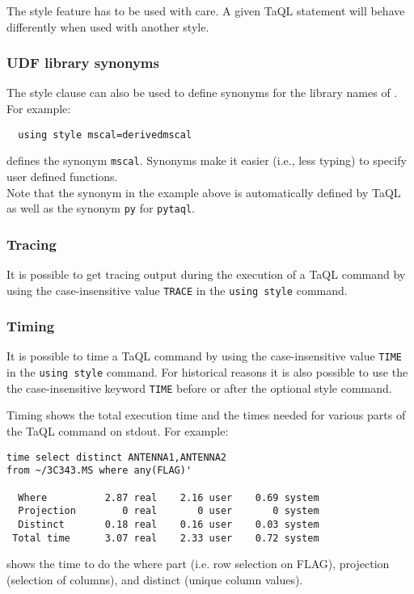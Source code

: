 The style feature has to be used with care. A given TaQL statement will
behave differently when used with another style.

\subsubsection{UDF library synonyms}
The style clause can also be used to define synonyms for the
library names of . For example:
\begin{verbatim}
  using style mscal=derivedmscal
\end{verbatim}
defines the synonym \texttt{mscal}. Synonyms make it
easier (i.e., less typing) to specify user defined functions.
\\Note that the synonym in the example above is automatically defined
by TaQL as well as the synonym \texttt{py} for \texttt{pytaql}.

\subsubsection{Tracing}
It is possible to get tracing output during the execution of a TaQL
command by using the case-insensitive value \texttt{TRACE} in the
\texttt{using style} command. 

\subsubsection{Timing}
It is possible to time a TaQL command by using the case-insensitive
value \texttt{TIME} in the \texttt{using style} command. 
For historical reasons it is also possible to use the the case-insensitive
keyword \texttt{TIME} before or after the optional style command.

Timing shows the total execution time and the times needed for various parts of the
TaQL command on stdout. For example:
\begin{verbatim}
time select distinct ANTENNA1,ANTENNA2
from ~/3C343.MS where any(FLAG)'

  Where          2.87 real    2.16 user    0.69 system
  Projection        0 real       0 user       0 system
  Distinct       0.18 real    0.16 user    0.03 system
 Total time      3.07 real    2.33 user    0.72 system
\end{verbatim}
shows the time to do the where part (i.e. row selection on FLAG),
projection (selection of columns), and distinct (unique column values).

